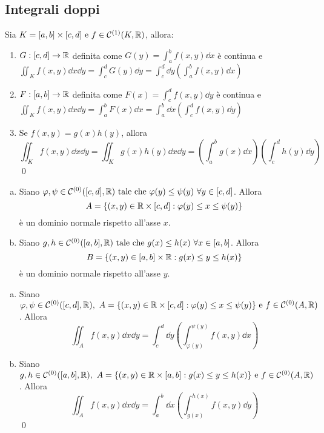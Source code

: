 \subsection{Integrali doppi}

\begin{theorem}
    Sia $K=[a,b]\times[c,d] \text{ e } f\in \mathcal{C}^{(1)}(K,\mathbb{R})$, allora:
    \begin{enumerate}
        \item $G:[c,d]\to \mathbb{R}$ definita come $G(y)=\int_a^bf(x,y)\dd x$ è continua e $\iint_Kf(x,y)\dd x\dd y=\int_c^dG(y)\dd y=\int_c^d\dd y(\int_a^b f(x,y)\dd x)$
        \item $F:[a,b]\to \mathbb{R}$ definita come $F(x)=\int_c^df(x,y)\dd y$ è continua e $\iint_Kf(x,y)\dd x\dd y=\int_a^bF(x)\dd x=\int_a^b\dd x(\int_c^d f(x,y)\dd y)$
        \item Se $f(x,y)=g(x)h(y)$, allora
        $$
            \iint_Kf(x,y)\dd x\dd y=\iint_Kg(x)h(y)\dd x\dd y=\left(\int_a^bg(x)\dd x\right)\left(\int_c^dh(y)\dd y\right)
        $$
        \qed
    \end{enumerate}
\end{theorem}

\begin{definition}
    \leavevmode
    \begin{enumerate}[a.]
        \item Siano $\varphi, \psi \in \mathcal{C}^{(0)}([c,d],\mathbb{R}) \text{ tale che } \varphi(y)\leq \psi(y)\ \forall y \in [c,d]$. Allora
        $$
            A=\{(x,y)\in \mathbb{R}\times[c,d]:\varphi(y)\leq x \leq \psi(y)\}
        $$
        è un dominio normale rispetto all'asse $x$.
        \item Siano $g, h \in \mathcal{C}^{(0)}([a,b],\mathbb{R}) \text{ tale che } g(x)\leq h(x)\ \forall x \in [a,b]$. Allora
        $$
            B=\{(x,y)\in [a,b]\times\mathbb{R}:g(x)\leq y \leq h(x)\}
        $$
        è un dominio normale rispetto all'asse $y$. 
    \end{enumerate}
\end{definition}

\begin{theorem}
    \leavevmode
    \begin{enumerate}[a.]
        \item Siano $\varphi, \psi \in \mathcal{C}^{(0)}([c,d],\mathbb{R}), \ A=\{(x,y)\in \mathbb{R}\times[c,d]:\varphi(y)\leq x \leq \psi(y)\} \text{ e } f \in \mathcal{C}^{(0)}(A,\mathbb{R})$. Allora
        $$
            \iint_Af(x,y)\dd x\dd y = \int_c^d\dd y\left(\int_{\varphi(y)}^{\psi(y)}f(x,y)\dd x\right)
        $$
        \item Siano $g, h \in \C{0}([a,b],\R), \ A=\{(x,y)\in \R\times[a,b]:g(x)\leq y \leq h(x)\} \e f \in \C{0}(A,\R)$. Allora
        $$
            \iint_Af(x,y)\dd x\dd y = \int_a^b\dd x\left(\int_{g(x)}^{h(x)}f(x,y)\dd y\right)
        $$
        \qed
    \end{enumerate}
\end{theorem}

